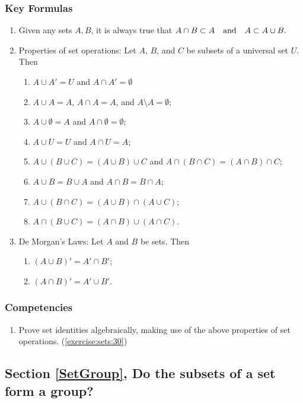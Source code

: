 \subsubsection*{Key Formulas}
\begin{enumerate}
\item
Given any sets $A, B$, it is always true that $A \cap B \subset A \mathrm{~~~and~~~} \\ A \subset A \cup B.$
\item    
Properties of set operations: Let $A$, $B$, and $C$ be subsets of a universal set $U$. Then
\begin{enumerate}
\item
$A \cup A' = U$ and $A \cap A' = \emptyset$
\item
$A \cup A = A$, $A \cap A = A$, and $A \setminus A = \emptyset$;
\item
$A \cup \emptyset = A$ and $A \cap \emptyset = \emptyset$;
\item
$A \cup U = U$ and $A \cap U = A$; 
\item
$A \cup (B \cup C) = (A \cup B) \cup C$ and  $A \cap (B \cap C) = (A \cap B) \cap C$;
\item
$A \cup B = B \cup A$ and $A \cap B = B \cap A$;
\item
$A \cup (B \cap C) = (A \cup B) \cap (A \cup C)$;
\item
$A \cap (B \cup C) = (A \cap B) \cup (A \cap C)$. 
\end{enumerate}
\item
De Morgan's Laws: Let $A$ and $B$ be sets. Then 
\begin{enumerate}
\item
$(A \cup B)' = A' \cap B'$; 
\item
$(A \cap B)' = A' \cup B'$.
\end{enumerate}
\end{enumerate}

\subsubsection*{Competencies}
\begin{enumerate}
\item
Prove set identities algebraically, making use of the above properties of set operations. (\ref{exercise:sets:30}) 
\end{enumerate}


\subsection*{Section \ref{SetGroup}, Do the subsets of a set form a group?}
